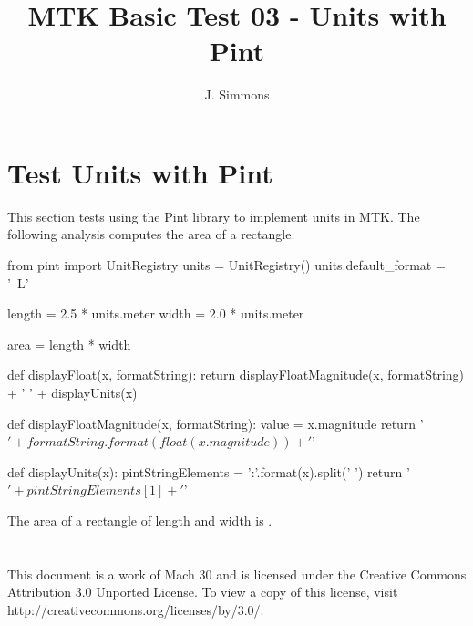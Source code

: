 \documentclass{article}
\title{MTK Basic Test 03 - Units with Pint}
\author{J. Simmons}
\begin{document}
\maketitle

\section{Test Units with Pint}
This section tests using the Pint library to implement units in MTK.  The following analysis computes the area of a rectangle.

\begin{sageblock}
from pint import UnitRegistry
units = UnitRegistry()
units.default_format = '~L'

length = 2.5 * units.meter
width = 2.0 * units.meter

area = length * width

def displayFloat(x, formatString):
  return displayFloatMagnitude(x, formatString) + ' ' + displayUnits(x)
  
def displayFloatMagnitude(x, formatString):
  value = x.magnitude
  return '$' + formatString.format(float(x.magnitude)) + '$'
  
def displayUnits(x):
  pintStringElements = '{:}'.format(x).split(' ')
  return '$' + pintStringElements[1] + '$'
  
\end{sageblock}

The area of a rectangle of length  and width  is .

\section*{}
This document is a work of Mach 30 and is licensed under the Creative Commons Attribution 3.0 Unported License. To view a copy of this license, visit http://creativecommons.org/licenses/by/3.0/.
\end{document}
